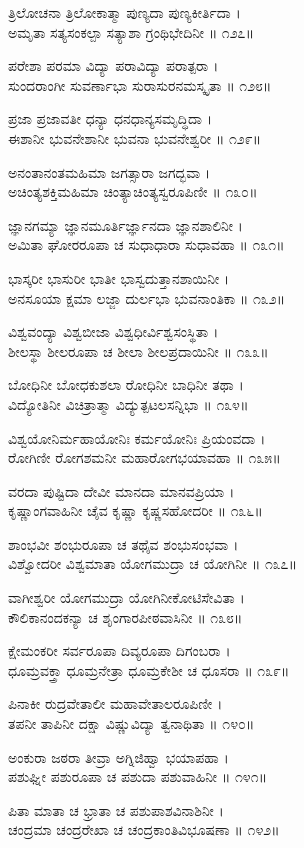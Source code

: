 ತ್ರಿಲೋಚನಾ ತ್ರಿಲೋಕಾತ್ಮಾ ಪುಣ್ಯದಾ ಪುಣ್ಯಕೀರ್ತಿದಾ ।\\
ಅಮೃತಾ ಸತ್ಯಸಂಕಲ್ಪಾ ಸತ್ಯಾಶಾ ಗ್ರಂಥಿಭೇದಿನೀ ॥ ೧೨೭॥

ಪರೇಶಾ ಪರಮಾ ವಿದ್ಯಾ ಪರಾವಿದ್ಯಾ ಪರಾತ್ಪರಾ ।\\
ಸುಂದರಾಂಗೀ ಸುವರ್ಣಾಭಾ ಸುರಾಸುರನಮಸ್ಕೃತಾ ॥ ೧೨೮॥

ಪ್ರಜಾ ಪ್ರಜಾವತೀ ಧನ್ಯಾ ಧನಧಾನ್ಯಸಮೃದ್ಧಿದಾ ।\\
ಈಶಾನೀ ಭುವನೇಶಾನೀ ಭುವನಾ ಭುವನೇಶ್ವರೀ ॥ ೧೨೯॥

ಅನಂತಾನಂತಮಹಿಮಾ ಜಗತ್ಸಾರಾ ಜಗದ್ಭವಾ ।\\
ಅಚಿಂತ್ಯಶಕ್ತಿಮಹಿಮಾ ಚಿಂತ್ಯಾಚಿಂತ್ಯಸ್ವರೂಪಿಣೀ ॥ ೧೩೦॥

ಜ್ಞಾನಗಮ್ಯಾ ಜ್ಞಾನಮೂರ್ತಿರ್ಜ್ಞಾನದಾ ಜ್ಞಾನಶಾಲಿನೀ ।\\
ಅಮಿತಾ ಘೋರರೂಪಾ ಚ ಸುಧಾಧಾರಾ ಸುಧಾವಹಾ ॥ ೧೩೧॥

ಭಾಸ್ಕರೀ ಭಾಸುರೀ ಭಾತೀ ಭಾಸ್ವದುತ್ತಾನಶಾಯಿನೀ ।\\
ಅನಸೂಯಾ ಕ್ಷಮಾ ಲಜ್ಜಾ ದುರ್ಲಭಾ ಭುವನಾಂತಿಕಾ ॥ ೧೩೨॥

ವಿಶ್ವವಂದ್ಯಾ ವಿಶ್ವಬೀಜಾ ವಿಶ್ವಧೀರ್ವಿಶ್ವಸಂಸ್ಥಿತಾ ।\\
ಶೀಲಸ್ಥಾ ಶೀಲರೂಪಾ ಚ ಶೀಲಾ ಶೀಲಪ್ರದಾಯಿನೀ ॥ ೧೩೩॥

ಬೋಧಿನೀ ಬೋಧಕುಶಲಾ ರೋಧಿನೀ ಬಾಧಿನೀ ತಥಾ ।\\
ವಿದ್ಯೋತಿನೀ ವಿಚಿತ್ರಾತ್ಮಾ ವಿದ್ಯುತ್ಪಟಲಸನ್ನಿಭಾ ॥ ೧೩೪॥

ವಿಶ್ವಯೋನಿರ್ಮಹಾಯೋನಿಃ ಕರ್ಮಯೋನಿಃ ಪ್ರಿಯಂವದಾ ।\\
ರೋಗಿಣೀ ರೋಗಶಮನೀ ಮಹಾರೋಗಭಯಾವಹಾ ॥ ೧೩೫॥

ವರದಾ ಪುಷ್ಟಿದಾ ದೇವೀ ಮಾನದಾ ಮಾನವಪ್ರಿಯಾ ।\\
ಕೃಷ್ಣಾಂಗವಾಹಿನೀ ಚೈವ ಕೃಷ್ಣಾ ಕೃಷ್ಣಸಹೋದರೀ ॥ ೧೩೬॥

ಶಾಂಭವೀ ಶಂಭುರೂಪಾ ಚ ತಥೈವ ಶಂಭುಸಂಭವಾ ।\\
ವಿಶ್ವೋದರೀ ವಿಶ್ವಮಾತಾ ಯೋಗಮುದ್ರಾ ಚ ಯೋಗಿನೀ ॥ ೧೩೭॥

ವಾಗೀಶ್ವರೀ ಯೋಗಮುದ್ರಾ ಯೋಗಿನೀಕೋಟಿಸೇವಿತಾ ।\\
ಕೌಲಿಕಾನಂದಕನ್ಯಾ ಚ ಶೃಂಗಾರಪೀಠವಾಸಿನೀ ॥ ೧೩೮॥

ಕ್ಷೇಮಂಕರೀ ಸರ್ವರೂಪಾ ದಿವ್ಯರೂಪಾ ದಿಗಂಬರಾ ।\\
ಧೂಮ್ರವಕ್ತ್ರಾ ಧೂಮ್ರನೇತ್ರಾ ಧೂಮ್ರಕೇಶೀ ಚ ಧೂಸರಾ ॥ ೧೩೯॥

ಪಿನಾಕೀ ರುದ್ರವೇತಾಲೀ ಮಹಾವೇತಾಲರೂಪಿಣೀ ।\\
ತಪನೀ ತಾಪಿನೀ ದಕ್ಷಾ ವಿಷ್ಣುವಿದ್ಯಾ ತ್ವನಾಥಿತಾ ॥ ೧೪೦॥

ಅಂಕುರಾ ಜಠರಾ ತೀವ್ರಾ ಅಗ್ನಿಜಿಹ್ವಾ ಭಯಾಪಹಾ ।\\
ಪಶುಘ್ನೀ ಪಶುರೂಪಾ ಚ ಪಶುದಾ ಪಶುವಾಹಿನೀ ॥ ೧೪೧॥

ಪಿತಾ ಮಾತಾ ಚ ಭ್ರಾತಾ ಚ ಪಶುಪಾಶವಿನಾಶಿನೀ ।\\
ಚಂದ್ರಮಾ ಚಂದ್ರರೇಖಾ ಚ ಚಂದ್ರಕಾಂತಿವಿಭೂಷಣಾ ॥ ೧೪೨॥

